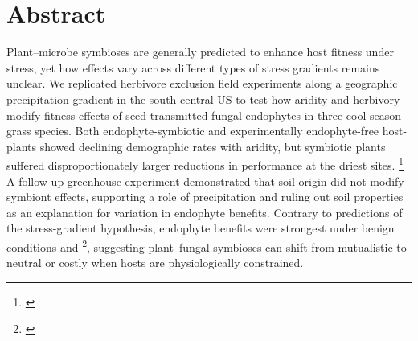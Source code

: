 \documentclass[12pt]{article}\usepackage[]{graphicx}\usepackage[dvipsnames]{xcolor}
\newcommand{\tom}[2]{{\color{red}{#1}}\footnote{\textit{\color{red}{#2}}}}
\begin{document}
\section*{Abstract}
Plant–microbe symbioses are generally predicted to enhance host fitness under stress, yet how effects vary across different types of stress gradients remains unclear. 
We replicated herbivore exclusion field experiments along a geographic precipitation gradient in the south-central US to test how aridity and herbivory modify fitness effects of seed-transmitted fungal endophytes in three cool-season grass species. 
Both endophyte-symbiotic and experimentally endophyte-free host-plants showed declining demographic rates with aridity, but symbiotic plants suffered disproportionately larger reductions in performance at the driest sites. 
\tom{Aridity mainly mediated endophyte effects on survival and growth, whereas herbivory had an overall weaker effect on the symbiosis and mainly influenced host reproduction. }{This sentence does not fully describe the relative importance of aridity and herbivory, which I think is important to do. I also think the abstract needs to better describe the herbivory results -- did herbivore exclusion help or hurt plants, and did it make endophytes more or less beneficial?}
A follow-up greenhouse experiment demonstrated that soil origin did not modify symbiont effects, supporting a role of precipitation and ruling out soil properties as an explanation for variation in endophyte benefits. 
Contrary to predictions of the stress-gradient hypothesis, endophyte benefits were strongest under benign conditions and \tom{weakened under stress}{Unclear if you are saying that they became less beneficial under stress, or switched from beneficial to costly under stress -- that's an important distinction.}, suggesting plant–fungal symbioses can shift from mutualistic to neutral or costly when hosts are physiologically constrained.
\newpage
\end{document}
